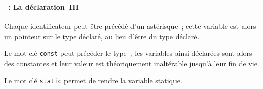 \begin{frame}[containsverbatim]
  \frametitle{\secname}
  \framesubtitle{\subsecname~: La déclaration~III}

  Chaque identificateur peut être précédé d'un astérisque~; cette variable est alors un pointeur sur le type déclaré, au lieu d'être du type déclaré.
  \vspace{0.5cm}
  \par
  Le mot clé \verb|const| peut précéder le type~; les variables ainsi déclarées sont alors des constantes et leur valeur est théoriquement inaltérable jusqu'à leur fin de vie.
  \vspace{0.5cm}
  \par
  Le mot clé \verb|static| permet de rendre la variable statique.
\end{frame}

